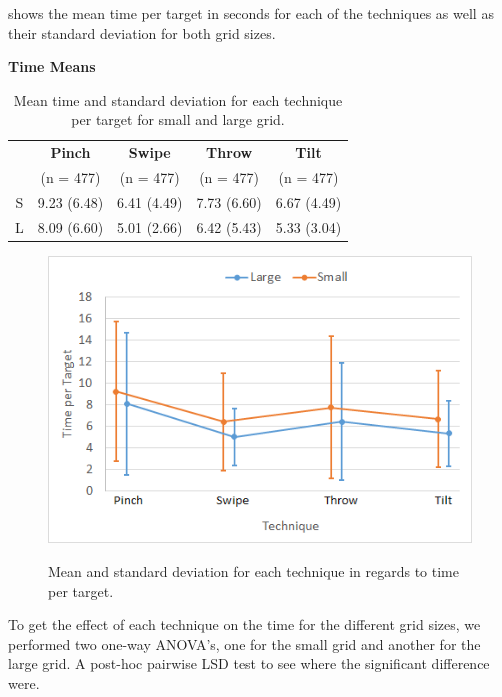  shows the mean time per target in seconds for each of the techniques as well as their standard deviation for both grid sizes. 
\begin{table}[H]
	\centering
	\textbf{Time Means}\\[4pt]
	\begin{adjustbox}{width=\columnwidth}
	\begin{tabular}{|c|c|c|c|c|}
		\hline
		\rowcolor[HTML]{9B9B9B} 
		 & \textbf{Pinch} & \textbf{Swipe} & \textbf{Throw} & \textbf{Tilt} \\ 
		 \rowcolor[HTML]{9B9B9B} 
		 & (n = 477) & (n = 477) & (n = 477) & (n = 477) \\ \hline
		S & 9.23 (6.48)          & 6.41  (4.49)         & 7.73 (6.60)          & 6.67 (4.49)  \\ \hline
		L & 8.09 (6.60)          & 5.01  (2.66)          & 6.42 (5.43)          & 5.33 (3.04) \\ \hline
	\end{tabular}
	\end{adjustbox}
	\caption{Mean time and standard deviation for each technique per target for small and large grid.}
	\label{tab:meanTimesTechnique}
\end{table}

\begin{figure}[H]
	{\includegraphics[width = 1\columnwidth ]{images/time.png}} 
	\caption{
		Mean and standard deviation for each technique in regards to time per target.
	}
	\label{fig:timeResults}
\end{figure}

To get the effect of each technique on the time for the different grid sizes, we performed two one-way ANOVA's, one for the small grid and another for the large grid.
A post-hoc pairwise LSD test to see where the significant difference were.


